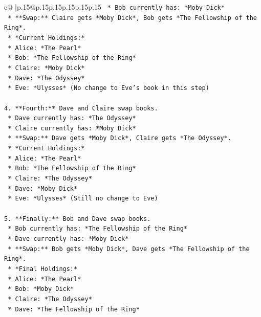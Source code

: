 \documentclass{article}
\begin{document}
{\begin{supertabular}{c@{$\;$}|p{.15\linewidth}@{}p{.15\linewidth}p{.15\linewidth}p{.15\linewidth}p{.15\linewidth}p{.15\linewidth}}
{{{\texttt{    *   Bob currently has: *Moby Dick*} \\
\texttt{    *   **Swap:** Claire gets *Moby Dick*, Bob gets *The Fellowship of the Ring*.} \\
\texttt{    *   *Current Holdings:*} \\
\texttt{        *   Alice: *The Pearl*} \\
\texttt{        *   Bob: *The Fellowship of the Ring*} \\
\texttt{        *   Claire: *Moby Dick*} \\
\texttt{        *   Dave: *The Odyssey*} \\
\texttt{        *   Eve: *Ulysses* (No change to Eve's book in this step)} \\
\\ 
\texttt{4.  **Fourth:** Dave and Claire swap books.} \\
\texttt{    *   Dave currently has: *The Odyssey*} \\
\texttt{    *   Claire currently has: *Moby Dick*} \\
\texttt{    *   **Swap:** Dave gets *Moby Dick*, Claire gets *The Odyssey*.} \\
\texttt{    *   *Current Holdings:*} \\
\texttt{        *   Alice: *The Pearl*} \\
\texttt{        *   Bob: *The Fellowship of the Ring*} \\
\texttt{        *   Claire: *The Odyssey*} \\
\texttt{        *   Dave: *Moby Dick*} \\
\texttt{        *   Eve: *Ulysses* (Still no change to Eve)} \\
\\ 
\texttt{5.  **Finally:** Bob and Dave swap books.} \\
\texttt{    *   Bob currently has: *The Fellowship of the Ring*} \\
\texttt{    *   Dave currently has: *Moby Dick*} \\
\texttt{    *   **Swap:** Bob gets *Moby Dick*, Dave gets *The Fellowship of the Ring*.} \\
\texttt{    *   *Final Holdings:*} \\
\texttt{        *   Alice: *The Pearl*} \\
\texttt{        *   Bob: *Moby Dick*} \\
\texttt{        *   Claire: *The Odyssey*} \\
\texttt{        *   Dave: *The Fellowship of the Ring*} \\
}}}
\end{supertabular}}
\end{document}
